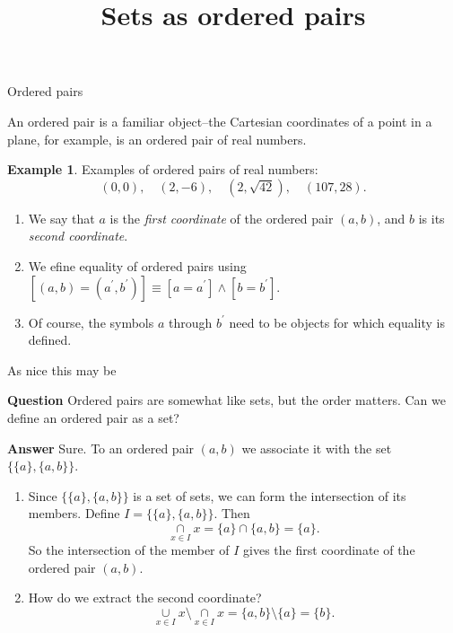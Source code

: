 \documentclass[fleqn]{beamer}
\title{\textbf{Sets as ordered pairs}}
\date{}
\theoremstyle{definition}
\newtheorem{myex}{Example}
\newenvironment{checklist}{
  \begin{enumerate}[\ding{51}]
    \addtolength{\itemsep}{-0.0\itemsep}}
  {\end{enumerate}}
\begin{document}
\frame{\titlepage}

\begin{frame}{Ordered pairs}

An ordered pair is a familiar object--the Cartesian coordinates of a point in a plane, 
for example, is an ordered pair of real numbers.

\begin{myex}
Examples of ordered pairs of real numbers:
\[
    (0,0), \quad (2,-6),  \quad  (2, \sqrt{42}), \quad   (107, 28).
\]
\end{myex}

\begin{checklist}

\item We say that \(a\) is the \emph{first coordinate} of the ordered pair \((a,b)\), and \(b\) is its \emph{second coordinate}.

\item  We efine equality of ordered pairs using   \([ (a,b) = (a^\prime, b^\prime)]   \equiv  [a = a^\prime] \land  [b = b^\prime] \).

\item Of course, the symbols \(a\) through \(b^\prime\) need to be objects for which 
equality is defined.
\end{checklist}

\end{frame}
\begin{frame}{As nice this may be}

\textbf{Question} Ordered pairs are somewhat like sets, but the order matters.  
Can we define an ordered pair as a set?

\textbf{Answer}   Sure.  To an ordered pair \((a,b)\) we associate it with the 
set  \(\{\{a\}, \{a,b\}\} \).

\vspace{0.2in}

\begin{checklist}

\item Since \(\{\{a\}, \{a,b\}\} \) is  a set of sets, we can form the intersection 
of its members. Define  \(I = \{\{a\}, \{a,b\}\} \). Then
\[
   \underset{x \in I}{\cap} x =  \{a\} \cap \{a,b\} = \{a\}.
\]
So the intersection of the member of \(I\) gives the first coordinate of the 
ordered pair \((a,b)\).

\item How do we extract the second coordinate?
\[
    \underset{x \in I}{\cup} x   \setminus \underset{x \in I}{\cap} x  = \{a,b\} \setminus \{a\} = \{b\}.
\]



\end{checklist}


\end{frame}
\end{document}
